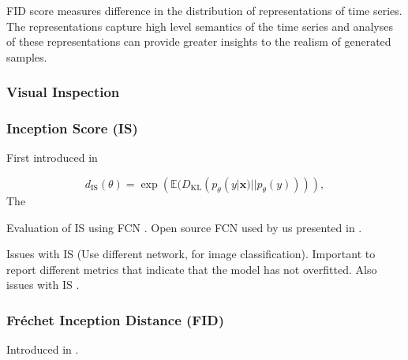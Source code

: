 \documentclass[../../thesis.tex]{subfiles}
\begin{document}
FID score measures difference in the distribution of representations of time series. The representations capture high level semantics of the time series and analyses of these representations can provide greater insights to the realism of generated samples. 
\subsubsection{Visual Inspection}

\subsubsection{Inception Score (IS)}
First introduced in \cite{salimans2016improved}\newline

\begin{equation}
    \label{IS}
    d_{\text{IS}}(\theta) = \exp\left( \mathbb{E}(D_{\text{KL}}(p_\theta(y|\mathbf{x}) || p_\theta(y))) \right),
\end{equation}
The 

Evaluation of IS using FCN \cite{wang2016time}. 
Open source FCN used by us presented in \cite{TimeVQVAE}. \newline


Issues with IS \cite{barratt2018note} (Use different network, for image classification).  Important to report different metrics that indicate that the model has not overfitted. 
Also issues with IS \cite{borji2021pros}.\newline

\subsubsection{Fréchet Inception Distance (FID)}

Introduced in \cite{heusel2018gans}. \newline
\end{document}
